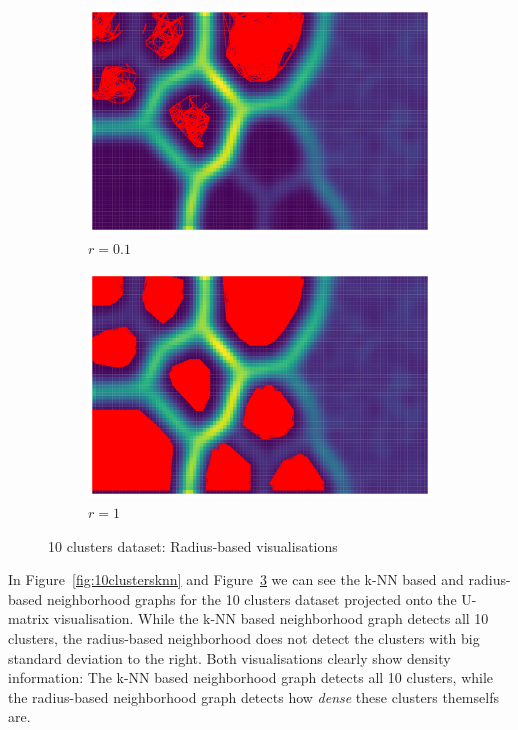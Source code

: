\documentclass[12pt]{article}
\begin{document}
\begin{figure}[t]
    \centering
    \begin{subfigure}{.5\textwidth}
        \centering
        \includegraphics[width=.9\linewidth]{vis/10clusters_r_01.png}
        \caption{$r=0.1$}
        \label{fig:chainlinkr0.1}
    \end{subfigure}%
    \begin{subfigure}{.5\textwidth}
        \centering
        \includegraphics[width=.9\linewidth]{vis/10clusters_r_1.png}
        \caption{$r=1$}
        \label{fig:chainlinkr1}
    \end{subfigure}
    \caption{10 clusters dataset: Radius-based visualisations}
    \label{fig:10clustersradius}
\end{figure}
In Figure~\ref{fig:10clustersknn} and Figure~\ref{fig:10clustersradius} we can see the k-NN based and radius-based neighborhood graphs for the 10 clusters dataset projected onto the U-matrix visualisation.
While the k-NN based neighborhood graph detects all 10 clusters, the radius-based neighborhood does not detect the clusters with big standard deviation to the right.
Both visualisations clearly show density information:
The k-NN based neighborhood graph detects all 10 clusters, while the radius-based neighborhood graph detects how \textit{dense} these clusters themselfs are.
\end{document}
